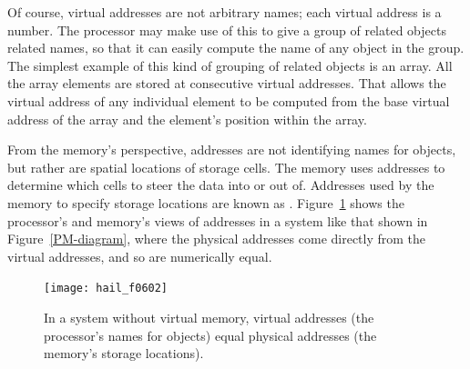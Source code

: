 Of course, virtual addresses are not arbitrary names; each virtual address is a
number.  The processor may make use of this to give a group of related
objects related names, so that it can easily compute the name of any
object in the group.  The simplest example of this kind of grouping of
related objects is an array.  All the array elements are stored at
consecutive virtual addresses.  That allows the virtual address of any individual
element to be computed from the base virtual address of the array and the
element's position within the array.

From the memory's perspective, addresses are not identifying names for
objects, but rather are spatial locations of storage cells.  The
memory uses addresses to determine which cells to steer the data into
or out of. Addresses used by the memory
to specify storage locations are known as
.  Figure~\ref{scan-6-1} shows the
processor's and memory's views of addresses in a system like
that shown in Figure~\ref{PM-diagram}, where the physical addresses come directly from the virtual addresses, and so are numerically equal.
\begin{figure}
\centerline{\texttt{[image: hail\_f0602]}}
\caption{In a system without virtual memory, virtual addresses (the
  processor's names for objects) equal physical addresses (the
  memory's storage locations).}
\label{scan-6-1}
\end{figure}

